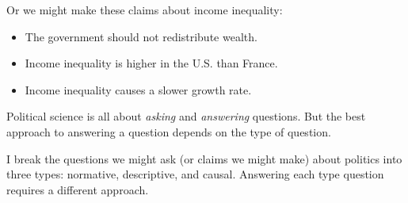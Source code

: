 \documentclass[]{book}
\providecommand{\tightlist}{%
  \setlength{\itemsep}{0pt}\setlength{\parskip}{0pt}}
\theoremstyle{definition}
\theoremstyle{definition}
\theoremstyle{definition}
\theoremstyle{remark}
\begin{document}
Or we might make these claims about income inequality:

\begin{itemize}
\tightlist
\item
  The government should not redistribute wealth.
\item
  Income inequality is higher in the U.S. than France.
\item
  Income inequality causes a slower growth rate.
\end{itemize}

Political science is all about \emph{asking} and \emph{answering}
questions. But the best approach to answering a question depends on the
type of question.

I break the questions we might ask (or claims we might make) about
politics into three types: normative, descriptive, and causal. Answering
each type question requires a different approach.
\end{document}
